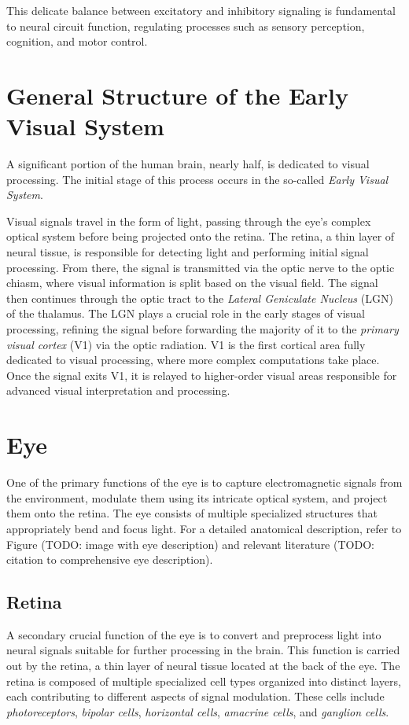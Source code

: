 This delicate balance between excitatory and inhibitory signaling is fundamental to neural 
circuit function, regulating processes such as sensory perception, cognition, and motor control.

\section{General Structure of the Early Visual System}
\label{sec:general_structure}
A significant portion of the human brain, nearly half, is dedicated to visual processing. 
The initial stage of this process occurs in the so-called \emph{Early Visual System}.

Visual signals travel in the form of light, passing through the eye's complex optical 
system before being projected onto the retina. The retina, a thin layer of neural tissue, 
is responsible for detecting light and performing initial signal processing. From there, 
the signal is transmitted via the optic nerve to the optic chiasm, where visual information
is split based on the visual field. The signal then continues through the optic tract 
to the \emph{Lateral Geniculate Nucleus} (LGN) of the thalamus. The LGN plays a crucial role
in the early stages of visual processing, refining the signal before forwarding the 
majority of it to the \emph{primary visual cortex} (V1) via the optic radiation. 
V1 is the first cortical area fully dedicated to visual processing, where more complex 
computations take place. Once the signal exits V1, it is relayed to higher-order visual 
areas responsible for advanced visual interpretation and processing.

\section{Eye}
\label{sec:eye}
One of the primary functions of the eye is to capture electromagnetic signals from 
the environment, modulate them using its intricate optical system, and project them 
onto the retina. The eye consists of multiple specialized structures that 
appropriately bend and focus light. For a detailed anatomical description, 
refer to Figure (TODO: image with eye description) and relevant literature 
(TODO: citation to comprehensive eye description).

\subsection{Retina}
\label{subsec:retina}
A secondary crucial function of the eye is to convert and preprocess light into 
neural signals suitable for further processing in the brain. This function is 
carried out by the retina, a thin layer of neural tissue located at the back of 
the eye. The retina is composed of multiple specialized cell types organized into 
distinct layers, each contributing to different aspects of signal modulation. These 
cells include \emph{photoreceptors}, \emph{bipolar cells}, \emph{horizontal cells}, 
\emph{amacrine cells}, and \emph{ganglion cells}.

